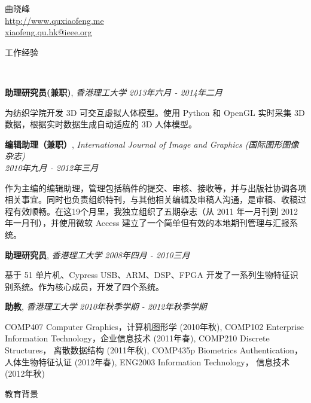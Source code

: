 \documentclass[9pt]{article}
\newenvironment{changemargin}[2]{%
  \begin{list}{}{%
    \setlength{\topsep}{0pt}%
    \setlength{\leftmargin}{#1}%
    \setlength{\rightmargin}{#2}%
    \setlength{\listparindent}{\parindent}%
    \setlength{\itemindent}{\parindent}%
    \setlength{\parsep}{\parskip}%
  }%
  \item[]}{\end{list}
}
\newcommand{\lineover}{
	\begin{changemargin}{-0.05in}{-0.05in}
		\vspace*{-8pt}
		\hrulefill \\
		\vspace*{-2pt}
	\end{changemargin}
}
\newcommand{\header}[1]{
	\begin{changemargin}{-0.5in}{-0.5in}
		\scshape{#1}\\
  	\lineover
	\end{changemargin}
}
\newcommand{\contact}[3]{
	\begin{changemargin}{-0.5in}{-0.5in}
		\begin{center}
			{\Large \scshape {#1}}\\ \smallskip
      {\url{#2}}\\ \smallskip 
      {\href{mailto:#3}{#3}}\\ \smallskip
		\end{center}
	\end{changemargin}
}
\newcommand{\jobtitle}[3]{
	\textbf{#1}, \emph{#2} \hfill \emph{#3}\\
}
\newcommand{\jobdescription}[1]{
	\begin{changemargin}{0.15in}{0.15in}
    \smallskip
		{#1}
    \medskip
	\end{changemargin}
}
\newenvironment{body} {
	\vspace*{-16pt}
	\begin{changemargin}{-0.25in}{-0.5in}
  }	
	{\end{changemargin}
}
\begin{document}
\contact{曲晓峰}{http://www.quxiaofeng.me}{xiaofeng.qu.hk@ieee.org}


\header{工作经验}

\begin{body}
  \vspace{14pt}

    \jobtitle{助理研究员(兼职)}{香港理工大学}{2013年六月 - 2014年二月}
    \jobdescription{
        为纺织学院开发 3D 可交互虚拟人体模型。使用 Python 和 OpenGL 实时采集 3D 数据，根据实时数据生成自动适应的 3D 人体模型。
    }

    \jobtitle{编辑助理（兼职）}{International Journal of Image and Graphics (国际图形图像杂志)\\}{2010年九月 - 2012年三月}
    \jobdescription{
        作为主编的编辑助理，管理包括稿件的提交、审核、接收等，并与出版社协调各项相关事宜。同时也负责组织特刊，与其他相关编辑及审稿人沟通，是审稿、收稿过程有效顺畅。在这19个月里，我独立组织了五期杂志（从 2011 年一月刊到 2012 年一月刊），并使用微软 Access 建立了一个简单但有效的本地期刊管理与汇报系统。
    }

	\jobtitle{助理研究员}{香港理工大学}{2008年四月 - 2010三月}
    \jobdescription{
        基于 51 单片机、Cypress USB、ARM、DSP、FPGA 开发了一系列生物特征识别系统。作为核心成员，开发了四个系统。
    }

	\jobtitle{助教}{香港理工大学}{2010年秋季学期 - 2012年秋季学期}
    \jobdescription {
        COMP407 Computer Graphics，计算机图形学 (2010年秋),
        COMP102 Enterprise Information Technology，企业信息技术 (2011年春), 
        COMP210 Discrete Structures， 离散数据结构 (2011年秋),
        COMP435p Biometrics Authentication， 人体生物特征认证 (2012年春), 
        ENG2003 Information Technology， 信息技术 (2012年秋)
    }

\end{body}

\medskip


\header{教育背景}
\end{document}
